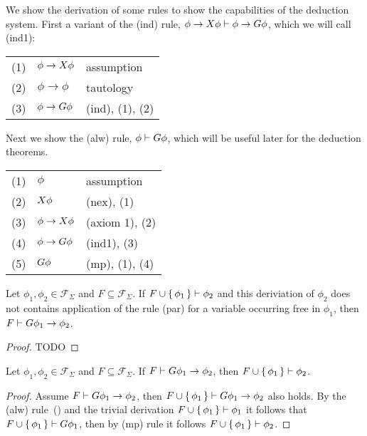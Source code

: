 \begin{example}\label{ex:alw}
  We show the derivation of some rules to show the capabilities of the deduction system. First a variant of the
  (ind) rule, $\phi \to X{\phi} \vdash \phi \to G{\phi}$, which we will call (ind1):

  \medskip
  \begin{tabularx}{300pt}{cXl}
    (1) & $\phi \to X{\phi}$ & assumption \\
    (2) & $\phi \to \phi$ & tautology \\
    (3) & $\phi \to G{\phi}$ & (ind), (1), (2)
  \end{tabularx}

  \medskip
  Next we show the (alw) rule, $\phi \vdash G{\phi}$, which will be useful later for the deduction theorems.

  \medskip
  \begin{tabularx}{300pt}{cXl}
    (1) & $\phi$ & assumption \\
    (2) & $X{\phi}$ & (nex), (1) \\
    (3) & $\phi \to X{\phi}$ & (axiom 1), (2) \\
    (4) & $\phi \to G{\phi}$ & (ind1), (3) \\
    (5) & $G{\phi}$ & (mp), (1), (4) \\
  \end{tabularx}
\end{example}

\begin{theorem}
  Let $\phi_1, \phi_2 \in \mathcal{F}_\Sigma$ and $F \subseteq \mathcal{F}_\Sigma$. If $F \cup \set{\phi_1} \vdash
  \phi_2$ and this deriviation of $\phi_2$ does not contains application of the rule (par) for a variable occurring free
  in $\phi_1$, then $F \vdash G{\phi_1} \to \phi_2$.
\end{theorem}
\begin{proof}
  TODO
\end{proof}

\begin{theorem}
  Let $\phi_1, \phi_2 \in \mathcal{F}_\Sigma$ and $F \subseteq \mathcal{F}_\Sigma$. If $F \vdash G{\phi_1} \to
  \phi_2$, then $F \cup \set{\phi_1} \vdash \phi_2$.
\end{theorem}
\begin{proof}
  Assume $F \vdash G{\phi_1} \to \phi_2$, then $F \cup \set{\phi_1} \vdash G{\phi_1} \to \phi_2$ also
  holds. By the (alw) rule~() and the trivial derivation $F \cup \set{\phi_1} \vdash \phi_1$ it follows
  that $F \cup \set{\phi_1} \vdash G{\phi_1}$, then by (mp) rule it follows $F \cup \set{\phi_1} \vdash \phi_2$.
\end{proof}

